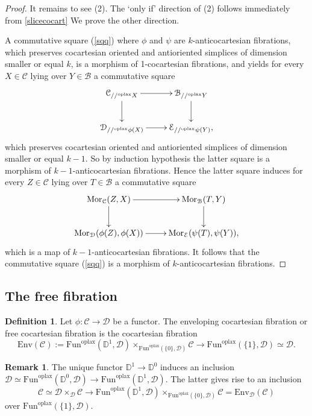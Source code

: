 \documentclass[10pt,oneside]{article}
\numberwithin{equation}{section} %
\numberwithin{figure}{section} %
\theoremstyle{plain}
\theoremstyle{definition}
\newtheorem{definition}[theorem]{Definition}
\newtheorem{remark}[theorem]{Remark}
\newcommand{\bD}{{\mathbb D}}
\newcommand{\mB}{{\mathcal B}}
\newcommand{\mC}{{\mathcal C}}
\newcommand{\mD}{{\mathcal D}}
\newcommand{\mE}{{\mathcal E}}
\newcommand{\Env}{{\mathrm{Env}}}
\newcommand{\Fun}{\mathrm{Fun}}
\newcommand{\oplax}{{\mathrm{oplax}}}
\newcommand{\Mor}{{\mathrm{Mor}}}
\begin{document}
\begin{proof}
It remains to see (2).
The `only if' direction of (2) follows immediately from \cref{slicecocart}
We prove the other direction.

A commutative square (\ref{sqq}) where $\phi$ and $\psi$ are $k$-anticocartesian fibrations, which preserves cocartesian oriented and antioriented simplices of dimension smaller or equal $k$, is a morphism of 1-cocartesian fibrations, and yields for every $X \in \mC $ lying over $Y \in \mB$ a commutative square \begin{equation}
\begin{xy}
\xymatrix{
\mC_{//^\oplax X} \ar[d] \ar[r]
& \mB_{//^\oplax Y} \ar[d]
\\ 
\mD_{//^\oplax \phi(X)} \ar[r] & \mE_{// ^\oplax \psi(Y)},
}
\end{xy}\end{equation}
which preserves cocartesian oriented and antioriented simplices of dimension smaller or equal $k-1.$
So by induction hypothesis the latter square is a morphism of 
$k-1$-anticocartesian fibrations.
Hence the latter square induces for every $Z \in \mC $ lying over $T \in \mB$ a commutative square 
\begin{equation}
\begin{xy}
\xymatrix{
\Mor_\mC(Z,X) \ar[d] \ar[r]
& \Mor_\mB(T,Y) \ar[d]
\\ 
\Mor_\mD(\phi(Z), \phi(X)) \ar[r] & \Mor_\mE(\psi(T),\psi(Y)),
}
\end{xy}\end{equation}
which is a map of $k-1$-anticocartesian fibrations.
It follows that the commutative square (\ref{sqq}) is a morphism of $k$-anticocartesian fibrations.
\end{proof}



\subsection{The free fibration}

\begin{definition}
Let $\phi: \mC \to \mD $ be a functor.
The enveloping cocartesian fibration or free cocartesian fibration
is the cocartesian fibration $$\Env(\mC):=\Fun^\oplax(\bD^1,\mD) \times_{\Fun^\oplax(\{0\},\mD)} \mC \to \Fun^\oplax(\{1\},\mD)\simeq \mD.$$

\end{definition}

\begin{remark}

The unique functor $\bD^1 \to \bD^0$ induces an inclusion
$ \mD \simeq \Fun^\oplax(\bD^0,\mD) \to \Fun^\oplax(\bD^1,\mD)$.
The latter gives rise to an inclusion
$$ \mC \simeq \mD \times_{\mD} \mC \to \Fun^\oplax(\bD^1,\mD) \times_{\Fun^\oplax(\{0\},\mD)} \mC = \Env_\mD(\mC) $$
over $\Fun^\oplax(\{1\},\mD).$

\end{remark}
\end{document}

